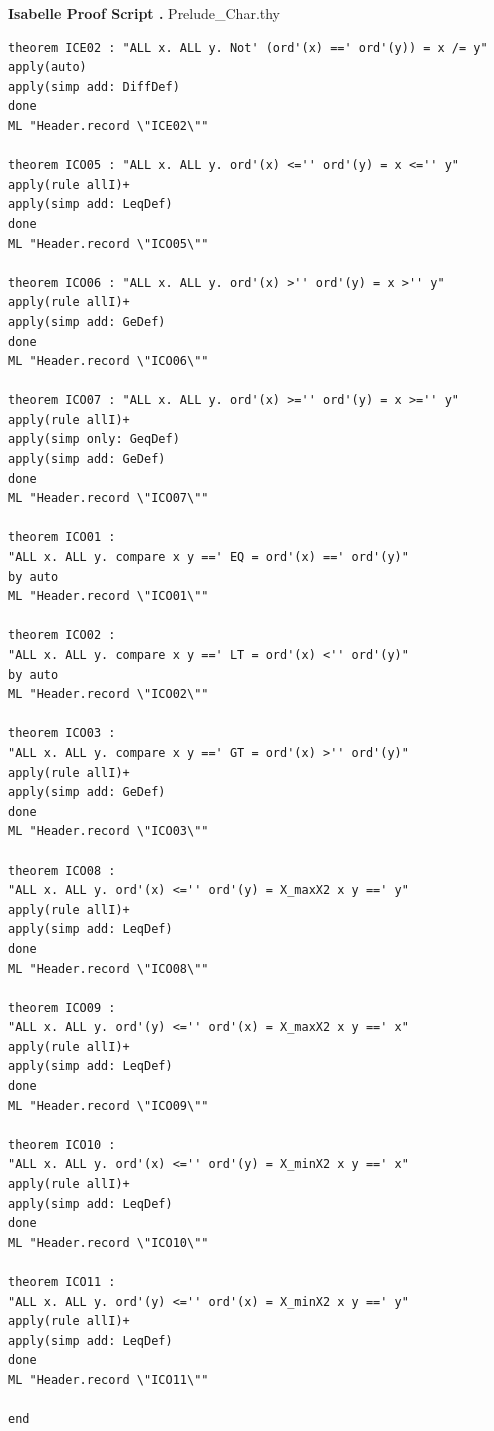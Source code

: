 \documentclass[12pt,twoside]{article}
\numberwithin{spec}{subsection}
\numberwithin{proof}{subsection}
\numberwithin{figure}{subsection}
\numberwithin{code}{subsection}
\begin{document}
\begin{multicols}{2}
\addtocounter{appindex}{1}
\large{\textbf{Isabelle Proof Script \thesection{}.\theappindex{}} Prelude\_Char.thy}
\label{pscript:Char}
\tiny
\begin{verbatim}
theorem ICE02 : "ALL x. ALL y. Not' (ord'(x) ==' ord'(y)) = x /= y"
apply(auto)
apply(simp add: DiffDef)
done
ML "Header.record \"ICE02\""

theorem ICO05 : "ALL x. ALL y. ord'(x) <='' ord'(y) = x <='' y"
apply(rule allI)+
apply(simp add: LeqDef)
done 
ML "Header.record \"ICO05\""

theorem ICO06 : "ALL x. ALL y. ord'(x) >'' ord'(y) = x >'' y"
apply(rule allI)+
apply(simp add: GeDef)
done 
ML "Header.record \"ICO06\""

theorem ICO07 : "ALL x. ALL y. ord'(x) >='' ord'(y) = x >='' y"
apply(rule allI)+
apply(simp only: GeqDef)
apply(simp add: GeDef)
done 
ML "Header.record \"ICO07\""

theorem ICO01 :
"ALL x. ALL y. compare x y ==' EQ = ord'(x) ==' ord'(y)"
by auto
ML "Header.record \"ICO01\""

theorem ICO02 :
"ALL x. ALL y. compare x y ==' LT = ord'(x) <'' ord'(y)"
by auto
ML "Header.record \"ICO02\""

theorem ICO03 :
"ALL x. ALL y. compare x y ==' GT = ord'(x) >'' ord'(y)"
apply(rule allI)+
apply(simp add: GeDef)
done
ML "Header.record \"ICO03\""

theorem ICO08 :
"ALL x. ALL y. ord'(x) <='' ord'(y) = X_maxX2 x y ==' y"
apply(rule allI)+
apply(simp add: LeqDef)
done
ML "Header.record \"ICO08\""

theorem ICO09 :
"ALL x. ALL y. ord'(y) <='' ord'(x) = X_maxX2 x y ==' x"
apply(rule allI)+
apply(simp add: LeqDef)
done
ML "Header.record \"ICO09\""

theorem ICO10 :
"ALL x. ALL y. ord'(x) <='' ord'(y) = X_minX2 x y ==' x"
apply(rule allI)+
apply(simp add: LeqDef)
done 
ML "Header.record \"ICO10\""

theorem ICO11 :
"ALL x. ALL y. ord'(y) <='' ord'(x) = X_minX2 x y ==' y"
apply(rule allI)+
apply(simp add: LeqDef)
done 
ML "Header.record \"ICO11\""

end
\end{verbatim}
\end{multicols}
\end{document}
